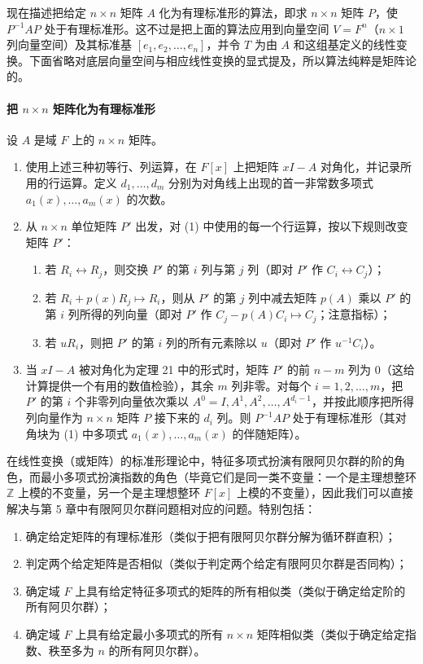 现在描述把给定 $n\times n$ 矩阵 $A$ 化为有理标准形的算法，即求 $n\times n$ 矩阵 $P$，使 $P^{-1}AP$ 处于有理标准形。这不过是把上面的算法应用到向量空间 $V=F^n$（$n\times1$ 列向量空间）及其标准基 $[e_1,e_2,\ldots,e_n]$，并令 $T$ 为由 $A$ 和这组基定义的线性变换。下面省略对底层向量空间与相应线性变换的显式提及，所以算法纯粹是矩阵论的。

\paragraph{把 $n\times n$ 矩阵化为有理标准形}
设 $A$ 是域 $F$ 上的 $n\times n$ 矩阵。
\begin{enumerate}[label=(\arabic*)]
\item 使用上述三种初等行、列运算，在 $F[x]$ 上把矩阵 $xI-A$ 对角化，并记录所用的行运算。定义 $d_1,\ldots,d_m$ 分别为对角线上出现的首一非常数多项式 $a_1(x),\ldots,a_m(x)$ 的次数。
\item 从 $n\times n$ 单位矩阵 $P'$ 出发，对 (1) 中使用的每一个行运算，按以下规则改变矩阵 $P'$：
\begin{enumerate}[label=(\alph*)]
\item 若 $R_i\leftrightarrow R_j$，则交换 $P'$ 的第 $i$ 列与第 $j$ 列（即对 $P'$ 作 $C_i\leftrightarrow C_j$）；
\item 若 $R_i+p(x)R_j\mapsto R_i$，则从 $P'$ 的第 $j$ 列中减去矩阵 $p(A)$ 乘以 $P'$ 的第 $i$ 列所得的列向量（即对 $P'$ 作 $C_j-p(A)C_i\mapsto C_j$；注意指标）；
\item 若 $uR_i$，则把 $P'$ 的第 $i$ 列的所有元素除以 $u$（即对 $P'$ 作 $u^{-1}C_i$）。
\end{enumerate}
\item 当 $xI-A$ 被对角化为定理 21 中的形式时，矩阵 $P'$ 的前 $n-m$ 列为 $0$（这给计算提供一个有用的数值检验），其余 $m$ 列非零。对每个 $i=1,2,\ldots,m$，把 $P'$ 的第 $i$ 个非零列向量依次乘以 $A^0=I,A^1,A^2,\ldots,A^{d_i-1}$，并按此顺序把所得列向量作为 $n\times n$ 矩阵 $P$ 接下来的 $d_i$ 列。则 $P^{-1}AP$ 处于有理标准形（其对角块为 (1) 中多项式 $a_1(x),\ldots,a_m(x)$ 的伴随矩阵）。
\end{enumerate}

在线性变换（或矩阵）的标准形理论中，特征多项式扮演有限阿贝尔群的阶的角色，而最小多项式扮演指数的角色（毕竟它们是同一类不变量：一个是主理想整环 $\mathbb Z$ 上模的不变量，另一个是主理想整环 $F[x]$ 上模的不变量），因此我们可以直接解决与第 5 章中有限阿贝尔群问题相对应的问题。特别包括：
\begin{enumerate}[label=(\Alph*)]
\item 确定给定矩阵的有理标准形（类似于把有限阿贝尔群分解为循环群直积）；
\item 判定两个给定矩阵是否相似（类似于判定两个给定有限阿贝尔群是否同构）；
\item 确定域 $F$ 上具有给定特征多项式的矩阵的所有相似类（类似于确定给定阶的所有阿贝尔群）；
\item 确定域 $F$ 上具有给定最小多项式的所有 $n\times n$ 矩阵相似类（类似于确定给定指数、秩至多为 $n$ 的所有阿贝尔群）。
\end{enumerate}

